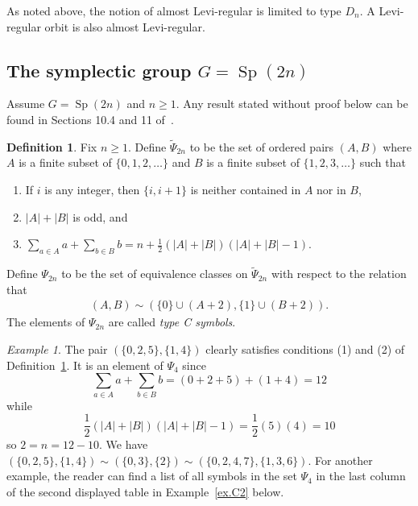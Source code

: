 \documentclass[reqno,11pt]{amsart}
\theoremstyle{remark}
\theoremstyle{remark}
\newtheorem{example}[Thm]{Example}
\theoremstyle{definition}
\theoremstyle{definition}
\theoremstyle{definition}
\newtheorem{Def}[Thm]{Definition}
\numberwithin{equation}{section}
\newcommand{\Sp}{\operatorname{Sp}}
\begin{document}
As noted above, the notion of almost Levi-regular is limited to type $D_n$.  A Levi-regular orbit is also almost Levi-regular.





\subsection{The symplectic group $G=\Sp(2n)$} \label{sec.Csymbols} Assume $G=\Sp(2n)$ and $n\geq 1$.  Any result stated without proof below can be found in Sections 10.4 and 11 of~\cite{Lu84}. 



\begin{Def}\label{def.typeCsymbols}
Fix $n\geq 1$. Define $\widetilde \Psi_{2n}$ to be the set of ordered pairs $(A,B)$ where $A$ is a finite subset of $\{0,1,2,\dots\}$ and $B$ is a finite subset of $\{1,2,3,\dots\}$ such that
\begin{enumerate}
\item If $i$ is any integer, then $\{i, i+1\}$ is neither contained in $A$ nor in $B$, 
\item $|A|+|B|$ is odd, and 
\item $\sum_{a\in A} a + \sum_{b\in B} b = n + \frac{1}{2}\left( |A|+|B| \right) \left(|A|+|B| -1 \right)$.
\end{enumerate}
Define $\Psi_{2n}$ to be the set of equivalence classes on $\widetilde\Psi_{2n}$ with respect to the relation that 
\begin{eqnarray}\label{eqn.symbol.rel}
(A,B) \sim (\{0\}\cup (A+2), \{1\}\cup(B+2)).
\end{eqnarray}
The elements of $\Psi_{2n}$ are called \emph{type C symbols}.
\end{Def}

\begin{example} The pair $(\{0,2,5\}, \{1,4\})$ clearly satisfies conditions (1) and (2) of Definition~\ref{def.typeCsymbols}. It is an element of $\Psi_{4}$ since
\[
\sum_{a\in A} a +\sum_{b\in B} b = (0+2+5)+(1+4) = 12
\]
while 
\[
\frac{1}{2}\left( |A|+|B| \right) \left(|A|+|B| -1 \right) = \frac{1}{2}(5)(4) = 10
\]
so $2=n = 12 - 10$.  We have $(\{0,2,5\},\{1,4\}) \sim ( \{0,3\}, \{2\} )  \sim (\{0,2,4,7\}, \{1,3,6\})$.
For another example, the reader can find a list of all symbols in the set $\Psi_{4}$ in the last column of the second displayed table in Example~\ref{ex.C2} below. 
\end{example}
\end{document}
